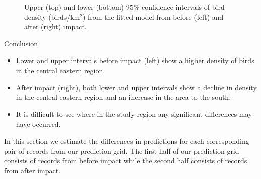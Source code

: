 \begin{figure}[h!]
  \centering
  \hfill
  \caption{Upper (top) and lower (bottom) 95\% confidence intervals of bird density (birds/km$^2$) from the fitted model from before (left) and after (right) impact.}
  \label{fig:nscis}
\end{figure}

\begin{block}{Conclusion}
\begin{itemize}
  \item Lower and upper intervals before impact (left) show a higher density of birds in the central eastern region.  
  \item After impact (right), both lower and upper intervals show a decline in density in the central eastern region and an increase in the area to the south.  
  \item It is difficult to see where in the study region any significant differences may have occurred.
\end{itemize}
\end{block}


\noindent In this section we estimate the differences in predictions for each corresponding pair of records from our prediction grid. The first half of our prediction grid consists of records from before impact while the second half consists of records from after impact. \\

